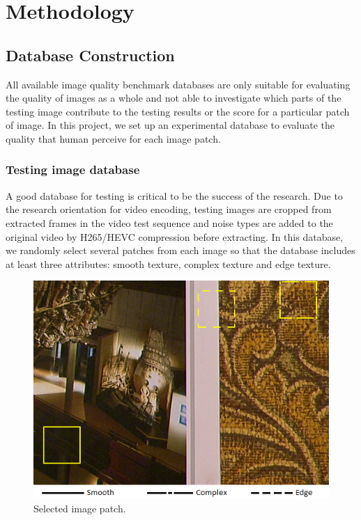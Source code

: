 \chapter{Methodology}

\section{Database Construction}

All available image quality benchmark databases are only suitable for evaluating the quality of images as a whole and not able to investigate which parts of the testing image contribute to the testing results or the score for a particular patch of image. 
In this project, we set up an experimental database to evaluate the quality that human perceive for each image patch.

\subsection{Testing image database}

A good database for testing is critical to be the success of the research. 
Due to the research orientation for video encoding, testing images are cropped from extracted frames in the video test sequence and noise types are added to the original video by H265/HEVC compression before extracting. 
In this database, we randomly select several patches from each image so that the database includes at least three attributes: smooth texture, complex texture and edge texture.

\begin{figure}[H]
  \includegraphics[width=\linewidth]{figures/imgpatches.png}
  \caption{Selected image patch.}
  \label{fig:selected-patch}
\end{figure}

